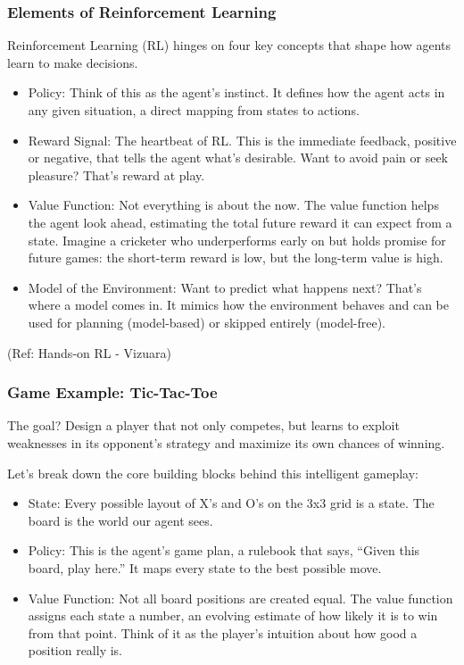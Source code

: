 \begin{frame}[fragile]\frametitle{Elements of Reinforcement Learning}

Reinforcement Learning (RL) hinges on four key concepts that shape how agents learn to make decisions.

\begin{itemize}
\item Policy: Think of this as the agent’s instinct. It defines how the agent acts in any given situation, a direct mapping from states to actions.
\item Reward Signal: The heartbeat of RL. This is the immediate feedback, positive or negative, that tells the agent what’s desirable. Want to avoid pain or seek pleasure? That’s reward at play.
\item Value Function: Not everything is about the now. The value function helps the agent look ahead, estimating the total future reward it can expect from a state. Imagine a cricketer who underperforms early on but holds promise for future games: the short-term reward is low, but the long-term value is high.
\item Model of the Environment: Want to predict what happens next? That’s where a model comes in. It mimics how the environment behaves and can be used for planning (model-based) or skipped entirely (model-free).
\end{itemize}

{\tiny (Ref: Hands-on RL - Vizuara)}

\end{frame}

\begin{frame}[fragile]\frametitle{Game Example: Tic-Tac-Toe}

The goal? Design a player that not only competes, but learns to exploit weaknesses in its opponent’s strategy and maximize its own chances of winning.

Let’s break down the core building blocks behind this intelligent gameplay:

\begin{itemize}
\item State: Every possible layout of X’s and O’s on the 3x3 grid is a state. The board is the world our agent sees.
\item Policy: This is the agent’s game plan, a rulebook that says, “Given this board, play here.” It maps every state to the best possible move.
\item Value Function: Not all board positions are created equal. The value function assigns each state a number, an evolving estimate of how likely it is to win from that point. Think of it as the player’s intuition about how good a position really is.
\end{itemize}


\end{frame}




